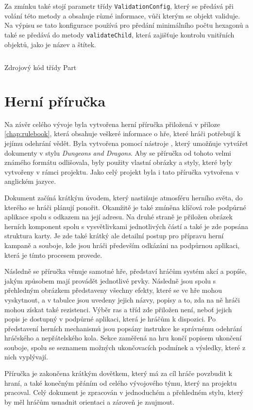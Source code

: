 Za zmínku také stojí parametr třídy  \texttt{ValidationConfig}, který se předává při volání této metody a obsahuje různé informace, vůči kterým se objekt validuje. Na výpisu se tato konfigurace používá pro předání minimálního počtu hexagonů a také se předává do metody \texttt{validateChild}, která zajišťuje kontrolu vnitřních objektů, jako je název a štítek.

\begin{listing}[H]
    \inputminted{Java}{code/Part.java}
    \caption{Zdrojový kód třídy Part}
    \label{code:part}
\end{listing}

\newpage
\section{Herní příručka}
\label{sec:game_manual}

Na závěr celého vývoje byla vytvořena herní příručka přiložená v příloze \ref{chap:rulebook}, která obsahuje veškeré informace o hře, které hráči potřebují k jejímu odehrání vědět. Byla vytvořena pomocí nástroje , který umožňuje vytvářet dokumenty v stylu \textit{Dungeons and Dragons}. Aby se příručka od tohoto velmi známého formátu odlišovala, byly použity vlastní obrázky a styly, které byly vytvořeny v rámci projektu. Jako celý projekt byla i tato příručka vytvořena v anglickém jazyce.

Dokument začíná krátkým úvodem, který nastiňuje atmosféru herního světa, do kterého se hráči plánují ponořit. Okamžitě je také zmíněna klíčová role podpůrné aplikace spolu s odkazem na její adresu. Na druhé straně je přiložen obrázek herních komponent spolu s vysvětlivkami jednotlivých částí a také je zde popsána struktura karty. Je zde také krátký ale detailní postup pro přípravu herní kampaně a souboje, kde jsou hráči především odkázáni na podpůrnou aplikaci, která je tímto procesem provede.

Následně se příručka věnuje samotné hře, představí hráčům systém akcí a popíše, jakým způsobem mají provádět jednotlivé prvky. Následně jsou spolu s přehledným obrázkem představeny všechny efekty, které se ve hře mohou vyskytnout, a v tabulce jsou uvedeny jejich názvy, popisy a to, zda na ně hráči mohou získat také rezistenci. Výběr ras a tříd zde přiložen není, neboť jejich popis je dostupný v podpůrné aplikaci, která je hráčům k dispozici. Po představení herních mechanismů jsou popsány instrukce ke správnému odehrání hráčského a nepřátelského kola. Sekce zaměřená na hru končí popisem ukončení souboje, spolu se seznamem možných ukončovacích podmínek a výsledky, které z nich vyplývají.

Příručka je zakončena krátkým dovětkem, který má za cíl hráče povzbudit k hraní, a také konečným přáním od celého vývojového týmu, který na projektu pracoval. Celý dokument je zpracován v jednoduchém a přehledném stylu, který by měl hráčům usnadnit orientaci a zároveň je zaujmout.


